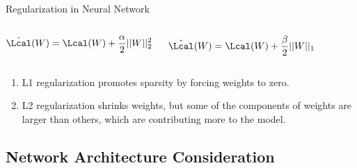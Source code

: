 \documentclass[aspectratio=169,xcolor=dvipsnames,svgnames,x11names,fleqn]{beamer}
\begin{document}
\begin{frame}{Regularization in Neural Network}

    \begin{columns}

        \begin{tcolorbox}[colframe=Indigo!20, colback=purple!10, title=L2 Regularization]
            \begin{align*}
                \hat{\Lcal}(W) = \Lcal(W)+ \frac{\alpha}{2} ||W||^2_2
            \end{align*}
        \end{tcolorbox}


        \begin{tcolorbox}[colframe=Blue!20, colback=Green!10, title=L1 Regularization]
            \begin{align*}
                \hat{\Lcal}(W) = \Lcal(W)+ \frac{\beta}{2} ||W||_1
            \end{align*}
        \end{tcolorbox}
        
        

    \end{columns}

    \begin{enumerate}
            \item L1 regularization promotes sparsity by forcing weights to zero.
            \item L2 regularization shrinks weights, but some of the components of weights are larger than others, which are contributing more to the model.
        \end{enumerate}
    
\end{frame}


\subsection{Network Architecture Consideration}

\begin{frame}
    \subsectionpage
\end{frame}
\end{document}
